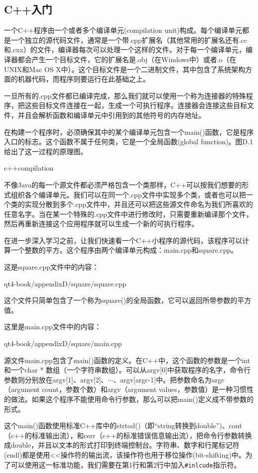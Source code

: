 \documentclass[11pt,oneside]{book}
\begin{document}
\begin{common-format}
\section{C++入门}
一个C++程序由一个或者多个编译单元(compilation unit)构成。每个编译单元都是一个独立的源代码文件，通常是一个带.cpp扩展名（其他常用的扩展名还有.cc和.cxx）的文件，编译器每次可以处理一个这样的文件。对于每一个编译单元，编译器都会产生一个目标文件，它的扩展名是.obj（在Windows中）或者.o（在UNIX和Mac OS X中）。这个目标文件是一个二进制文件，其中包含了系统架构方面的机器代码，而程序则要运行在此基础之上。  

一旦所有的.cpp文件都已编译完成，那么我们就可以使用一个称为连接器的特殊程序，把这些目标文件连接在一起，生成一个可执行程序。连接器会连接这些目标文件，并且会解析函数和编译单元中引用到的其他符号的内存地址。

在构建一个程序时，必须确保其中的某个编译单元包含一个main()函数，它是程序入口的标志。这个函数不属于任何类，它是一个全局函数(global function)。图D.1给出了这一过程的原理图。
\begin{fig}[0.8]{c++compilation}
\caption{C++的编译过程（在Windows中）}
\label{fig:c++compilation}
\end{fig}

不像Java的每一个源文件都必须严格包含一个类那样，C++可以按我们想要的形式组织各个编译单元。我们可以在同一个.cpp文件中实现多个类，或者也可以把一个类的实现分散到多个.cpp文件中，并且还可以把这些源文件命名为我们所喜欢的任意名字。当在某一个特殊的.cpp文件中进行修改时，只需要重新编译那个文件，然后再重新连接这个应用程序就可以生成一个新的可执行程序。

在进一步深入学习之前，让我们快速看一个C++小程序的源代码，该程序可以计算一个整数的平方。这个程序由两个编译单元构成：main.cpp和square.cpp。

这是square.cpp文件中的内容：
\begin{cppinput}{qt4-book/appendixD/square/square.cpp}
\end{cppinput}

这个文件只简单包含了一个称为square()的全局函数，它可以返回所带参数的平方值。

这里是main.cpp文件中的内容：
\begin{cppinput}{qt4-book/appendixD/square/main.cpp}
\end{cppinput}

源文件main.cpp包含了main()函数的定义。在C++中，这个函数的参数是一个int和一个char * 数组（一个字符串数组）。可以从argv[0]中获取程序的名字，命令行参数则分别放在argv[1]、argv[2]、$\cdots$、argv[argc-1]中。把参数命名为argc（argument count，参数个数）和argv（argument values，参数值）是一种习惯性的做法。如果这个程序不能使用命令行参数，那么可以把main()定义成不带参数的形式。
 
 这个main()函数使用标准C++库中的strtod()（即“string转换到double”)、cout（c++的标准输出流），和cerr（c++的标准错误信息输出流），把命令行参数转换成double，并且以文本的形式打印到终端控制台。字符串、数字和行尾标记符(endl)都是使用<<操作符的输出流，该操作符也用于移位操作(bit-shifting)中。为了可以使用这一标准功能，我们需要在第1行和第2行中加入\verb+#inlcude+指示符。




\end{common-format}
\end{document}
